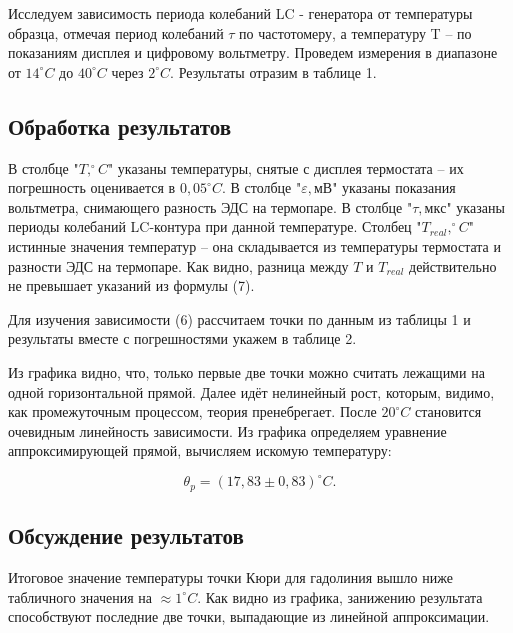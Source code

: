\documentclass[a4paper, fontsize = 14pt]{article}
\begin{document}
Исследуем зависимость периода колебаний LC - генератора от температуры образца, отмечая период колебаний $\tau$ по частотомеру, а температуру T -- по показаниям дисплея и цифровому вольтметру. Проведем измерения в диапазоне от $14 ^\circ C$ до $40 ^\circ C$ через $2 ^\circ C$. Результаты отразим в таблице 1.

\subsection*{Обработка результатов}

В столбце "$T, ^\circ C$" указаны температуры, снятые с дисплея термостата -- их погрешность оценивается в $0,05 ^\circ C$. В столбце "$\varepsilon, мВ$" указаны показания вольтметра, снимающего разность ЭДС на термопаре. В столбце "$\tau, мкс$" указаны периоды колебаний LC-контура при данной температуре. Столбец "$T_{real}, ^\circ C$" истинные значения температур -- она складывается из температуры термостата и разности ЭДС на термопаре. Как видно, разница между $T$ и $T_{real}$ действительно не превышает указаний из формулы (7).

Для изучения зависимости (6) рассчитаем точки по данным из таблицы 1 и результаты вместе с погрешностями укажем в таблице 2. 

Из графика видно, что, только первые две точки можно считать лежащими на одной горизонтальной прямой. Далее идёт нелинейный рост, которым, видимо, как промежуточным процессом, теория пренебрегает. После $20 ^\circ C$ становится очевидным линейность зависимости. Из графика определяем уравнение аппроксимирующей прямой, вычисляем искомую температуру:

\begin{equation}
    \theta_p = (17,83\pm0,83) ^\circ C.
\end{equation}

\subsection*{Обсуждение результатов}

Итоговое значение температуры точки Кюри для гадолиния вышло ниже табличного значения на $\approx 1 ^\circ C$. Как видно из графика, занижению результата способствуют последние две точки, выпадающие из линейной аппроксимации.
\end{document}
